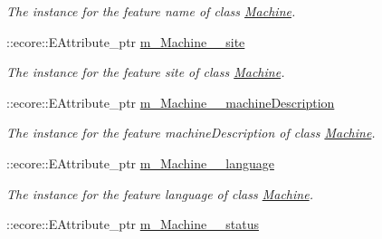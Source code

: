 \begin{DoxyCompactItemize}
\begin{DoxyCompactList}\small\item\em The instance for the feature name of class \hyperlink{classUMS__Data_1_1Machine}{Machine}. \item\end{DoxyCompactList}\item 
\hypertarget{classUMS__Data_1_1UMS__DataPackage_af338c47bd9ce601a91e2a9eb377d7f3d}{
::ecore::EAttribute\_\-ptr \hyperlink{classUMS__Data_1_1UMS__DataPackage_af338c47bd9ce601a91e2a9eb377d7f3d}{m\_\-Machine\_\-\_\-site}}
\label{classUMS__Data_1_1UMS__DataPackage_af338c47bd9ce601a91e2a9eb377d7f3d}

\begin{DoxyCompactList}\small\item\em The instance for the feature site of class \hyperlink{classUMS__Data_1_1Machine}{Machine}. \item\end{DoxyCompactList}\item 
\hypertarget{classUMS__Data_1_1UMS__DataPackage_a80c576ceb4f36a8957e3a5f78830fd29}{
::ecore::EAttribute\_\-ptr \hyperlink{classUMS__Data_1_1UMS__DataPackage_a80c576ceb4f36a8957e3a5f78830fd29}{m\_\-Machine\_\-\_\-machineDescription}}
\label{classUMS__Data_1_1UMS__DataPackage_a80c576ceb4f36a8957e3a5f78830fd29}

\begin{DoxyCompactList}\small\item\em The instance for the feature machineDescription of class \hyperlink{classUMS__Data_1_1Machine}{Machine}. \item\end{DoxyCompactList}\item 
\hypertarget{classUMS__Data_1_1UMS__DataPackage_a1c6ea71cf97cc21a6871183326710d95}{
::ecore::EAttribute\_\-ptr \hyperlink{classUMS__Data_1_1UMS__DataPackage_a1c6ea71cf97cc21a6871183326710d95}{m\_\-Machine\_\-\_\-language}}
\label{classUMS__Data_1_1UMS__DataPackage_a1c6ea71cf97cc21a6871183326710d95}

\begin{DoxyCompactList}\small\item\em The instance for the feature language of class \hyperlink{classUMS__Data_1_1Machine}{Machine}. \item\end{DoxyCompactList}\item 
\hypertarget{classUMS__Data_1_1UMS__DataPackage_a7a8cb4fcf84cc12bc4bbf138bc8f904e}{
::ecore::EAttribute\_\-ptr \hyperlink{classUMS__Data_1_1UMS__DataPackage_a7a8cb4fcf84cc12bc4bbf138bc8f904e}{m\_\-Machine\_\-\_\-status}}
\label{classUMS__Data_1_1UMS__DataPackage_a7a8cb4fcf84cc12bc4bbf138bc8f904e}


\end{DoxyCompactItemize}
